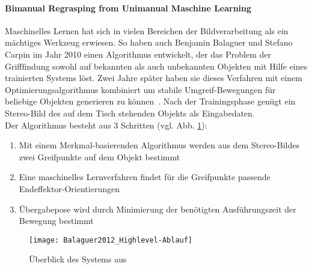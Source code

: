\paragraph{Bimanual Regrasping from Unimanual Maschine Learning} 

Maschinelles Lernen hat sich in vielen Bereichen der Bildverarbeitung als ein mächtiges Werkzeug erwiesen. So haben auch Benjamin Balaguer und Stefano Carpin im Jahr 2010 einen Algorithmus entwickelt, der das Problem der Grifffindung sowohl auf bekannten als auch unbekannten Objekten mit Hilfe eines trainierten Systems löst. Zwei Jahre später haben sie dieses Verfahren mit einem Optimierungsalgorithmus kombiniert um stabile Umgreif-Bewegungen für beliebige Objekten generieren zu können~\citep{balaguer2012bimanual}. Nach der Trainingsphase genügt ein Stereo-Bild des auf dem Tisch stehenden Objekts als Eingabedaten.\\

Der Algorithmus besteht aus 3 Schritten (vgl. Abb. \ref{fig:Balaguer_Highlevel}):
\begin{enumerate}
\item Mit einem Merkmal-basierenden Algorithmus werden aus dem Stereo-Bildes zwei Greifpunkte auf dem Objekt bestimmt
\item Eine maschinelles Lernverfahren findet für die Greifpunkte passende Endeffektor-Orientierungen
\item Übergabepose wird durch Minimierung der benötigten Ausführungszeit der Bewegung bestimmt
\end{enumerate}

\begin{figure}[h]
\begin{center}
\texttt{[image: Balaguer2012\_Highlevel-Ablauf]}
\caption{Überblick des Systems aus~\cite{balaguer2012bimanual}}
\label{fig:Balaguer_Highlevel}
\end{center}
\end{figure}

